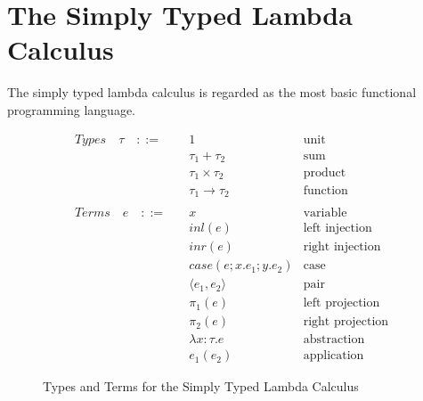 \chapter{The Simply Typed Lambda Calculus}
\label{chap: stlc}

The simply typed lambda calculus is regarded as the most basic functional programming language. 

\begin{figure}[h]
    \begin{align*}
        Types \quad \tau \quad ::= \quad & 1 &\text{unit} \\
        & \tau_1 + \tau_2 &\text{sum} \\
        & \tau_1 \times \tau_2 &\text{product} \\
        & \tau_1 \rightarrow \tau_2 &\text{function} \\
        \\
        Terms \quad e \quad ::= \quad & x &\text{variable} \\
        & inl(e) &\text{left injection} \\
        & inr(e) &\text{right injection} \\
        & case(e;x.e_1;y.e_2) &\text{case} \\
        & \langle e_1, e_2 \rangle &\text{pair} \\
        & \pi_1 (e) &\text{left projection} \\
        & \pi_2 (e) &\text{right projection} \\
        & \lambda x: \tau. e &\text{abstraction} \\
        & e_1 (e_2) &\text{application}
    \end{align*}
    \caption{Types and Terms for the Simply Typed Lambda Calculus}
    \label{fig: tt stlc}
\end{figure}


